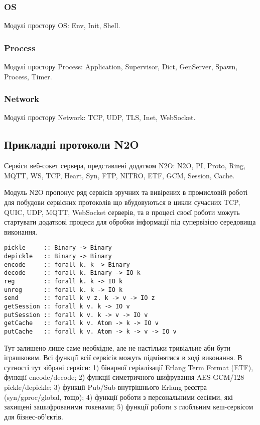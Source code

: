 \subsubsection{OS}
Модулі простору OS: Env, Init, Shell.

\subsubsection{Process}
Модулі простору Process: Application, Supervisor, Dict, GenServer, Spawn, Process, Timer.

\subsubsection{Network}
Модулі простору Network: TCP, UDP, TLS, Inet, WebSocket.

\subsection{Прикладні протоколи N2O}
Сервіси веб-сокет сервера, представлені додатком N2O: N2O, PI, Proto,
Ring, MQTT, WS, TCP, Heart, Syn, FTP, NITRO, ETF, GCM, Session, Cache.

Модуль N2O пропонує ряд сервісів зручних та вивірених в промисловій роботі для побудови
сервісних протоколів що вбудовуються в цикли сучасних TCP, QUIC, UDP, MQTT, WebSocket серверів,
та в процесі своєї роботи можуть стартувати додаткові процеси для обробки інформації під
супервізією середовища виконання.

\begin{lstlisting}
pickle     :: Binary -> Binary
depickle   :: Binary -> Binary
encode     :: forall k. k -> Binary
decode     :: forall k. Binary -> IO k
reg        :: forall k. k -> IO k
unreg      :: forall k. k -> IO k
send       :: forall k v z. k -> v -> IO z
getSession :: forall k v. k -> IO v
putSession :: forall k v. k -> v -> IO v
getCache   :: forall k v. Atom -> k -> IO v
putCache   :: forall k v. Atom -> k -> v -> IO v
\end{lstlisting}

Тут залишено лише саме необхідне, але не настільки тривіальне аби бути іграшковим.
Всі функції всії сервісів можуть підмінятися в ході виконання.
В сутності тут зібрані сервіси:
1) бінарної серіалізації Erlang Term Format (ETF), функції encode/decode;
2) функції симетричного шифрування AES-GCM/128 pickle/depickle;
3) функції Pub/Sub внутрішнього Erlang реєстра (syn/gproc/global, тощо);
4) функції роботи з персональними сесіями, які захищені зашифрованими токенами;
5) функції роботи з глобльним кеш-сервісом для бізнес-об'єктів.

